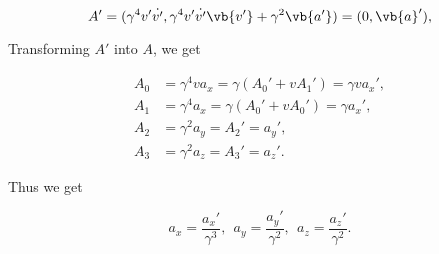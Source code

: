 \documentclass[english,a4paper,12pt]{report}
\begin{document}
\begin{equation}
    A' = (\gamma ^{4}v' \dot{v'} , \gamma ^{4} v' \dot{v'} \vb{v'} + \gamma ^2 \vb{a'}) = (0,\vb{a} '),
\end{equation}

Transforming \(A'\) into \(A\), we get 

\begin{equation}
    \begin{aligned}
        A_0 &= \gamma ^{4}va_{x} = \gamma (A_0 ' + vA_1 ') = \gamma v a_{x}', \\
        A_1 &= \gamma ^{4} a_{x} = \gamma (A_0 ' + vA_0 ' ) = \gamma a_{x}', \\
        A_2 &= \gamma ^2 a_{y} = A_2 ' = a_{y}', \\
        A_3 &= \gamma ^2 a_{z} = A_3 ' = a_{z}'.           
    \end{aligned}
\end{equation}

Thus we get

\begin{equation}
    a_{x} = \frac{a_{x}' }{\gamma ^3 }, ~~ a_{y} = \frac{a_{y}' }{\gamma ^2}, ~~ a_{z} = \frac{a_{z}' }{\gamma ^2}.      
\end{equation}
\end{document}
